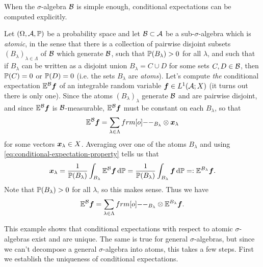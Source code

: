 When the $\sigma$-algebra $\mc{B}$ is simple enough, conditional expectations can be computed explicitly.

\begin{example}\label{eg:atomic-CE}
  Let $(\Omega,\mc{A},\P)$ be a probability space and let $\mc{B} \subset \mc{A}$ be a sub-$\sigma$-algebra which is \emph{atomic}, in the sense that there is a collection of pairwise disjoint subsets $(B_\lambda)_{\lambda \in \Lambda}$ of $\mc{B}$ which generate $\mc{B}$, such that $\P(B_{\lambda}) > 0$ for all $\lambda$, and such that if $B_\lambda$ can be written as a disjoint union $B_\lambda = C \cup D$ for some sets $C,D \in \mc{B}$, then $\P(C) = 0$ or $\P(D) = 0$ (i.e. the sets $B_\lambda$ are \emph{atoms}).
  Let's compute \emph{the} conditional expectation $\E^{\mc{B}}\mb{f}$ of an integrable random variable $\mb{f} \in L^1(\mc{A};X)$ (it turns out there is only one).
  Since the atoms $(B_\lambda)_{\lambda}$ generate $\mc{B}$ and are pairwise disjoint, and since $\E^{\mc{B}}\mb{f}$ is $\mc{B}$-measurable, $\E^{\mc{B}}\mb{f}$ must be constant on each $B_\lambda$, so that
  \begin{equation*}
    \E^{\mc{B}} \mb{f} = \sum_{\lambda \in \Lambda} \1_{B_\lambda} \otimes \mb{x}_\lambda
  \end{equation*}
  for some vectors $\mb{x}_{\lambda} \in X$.
  Averaging over one of the atoms $B_{\lambda}$ and using \eqref{eq:conditional-expectation-property} tells us that
  \begin{equation*}
    \begin{aligned}
      \mb{x}_\lambda = \frac{1}{\P(B_\lambda)} \int_{B_\lambda} \E^{\mc{B}} \mb{f} \, \dd\P = \frac{1}{\P(B_\lambda)} \int_{B_\lambda} \mb{f} \, \dd\P =: \E^{B_{\lambda}} \mb{f}.
    \end{aligned}
  \end{equation*}
  Note that $\P(B_{\lambda}) > 0$ for all $\lambda$, so this makes sense.
  Thus we have
  \begin{equation*}
    \E^{\mc{B}} \mb{f} = \sum_{\lambda \in \Lambda} \1_{B_\lambda} \otimes \E^{B_{\lambda}} \mb{f}.
  \end{equation*}
\end{example}

This example shows that conditional expectations with respect to atomic $\sigma$-algebras exist and are unique.
The same is true for general $\sigma$-algebras, but since we can't decompose a general $\sigma$-algebra into atoms, this takes a few steps.
First we establish the uniqueness of conditional expectations.

